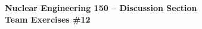 \documentclass{report}
\begin{document}
\begin{center}
\textbf{\large Nuclear Engineering 150 -- Discussion Section}\\ 
\textbf{Team Exercises \#12}
\end{center}


\newpage


\newpage
\end{document}
